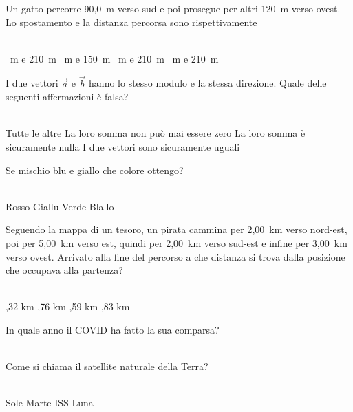 \documentclass[a4paper,11pt]{exam}
\begin{document}
        \begin{center} 
        \end{center}
\begin{questions}

    
\question Un gatto percorre 90,0~m verso sud e poi prosegue per altri 120~m verso ovest. Lo spostamento e la distanza percorsa sono rispettivamente\\\
\begin{oneparchoices}
  ~m e 210~m
  ~m e 150~m
  \choice 210~m e 210~m
  ~m e 210~m
\end{oneparchoices}

    
\question I due vettori $\vec{a}$ e $\vec{b}$ hanno lo stesso modulo e la stessa direzione. Quale delle seguenti affermazioni è falsa?\\\
\begin{oneparchoices}
  \choice Tutte le altre
  \choice La loro somma non può mai essere zero
  \choice La loro somma è sicuramente nulla
  \choice I due vettori sono sicuramente uguali
\end{oneparchoices}

    
\question Se mischio blu e giallo che colore ottengo?\\\
\begin{oneparchoices}
  \choice Rosso
  \choice Giallu
  \choice Verde
  \choice Blallo
\end{oneparchoices}

    
\question Seguendo la mappa di un tesoro, un pirata cammina per 2,00~km verso nord-est, poi per 5,00~km verso est, quindi per 2,00~km verso sud-est e infine per 3,00~km verso ovest. Arrivato alla fine del percorso a che distanza si trova dalla posizione che occupava alla partenza?\\\
\begin{oneparchoices}
  \choice 6,32 km
  ,76 km
  \choice 4,59 km
  \choice 4,83 km
\end{oneparchoices}

    
\question In quale anno il COVID ha fatto la sua comparsa?\\\
\begin{oneparchoices}
  \choice 2001
  \choice 1943
  \choice 2020
  \choice 2019
\end{oneparchoices}

    
\question Come si chiama il satellite naturale della Terra?\\\
\begin{oneparchoices}
  \choice Sole
  \choice Marte
  \choice ISS
  \choice Luna
\end{oneparchoices}


\end{questions}
\end{document}
